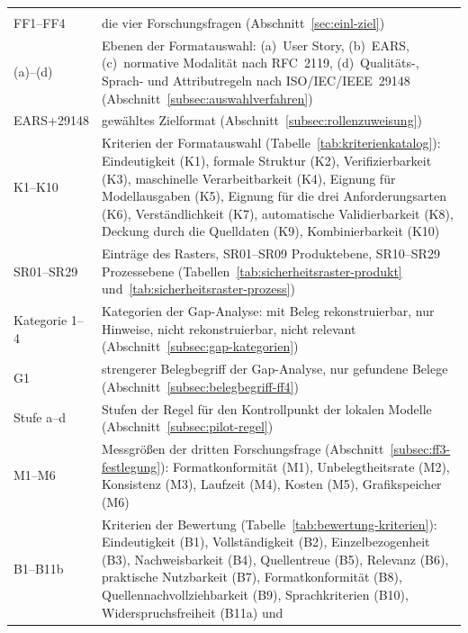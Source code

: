 \documentclass[11pt,a4paper]{report}
\begin{document}
{\begin{longtable}{@{}>{\raggedright\arraybackslash}p{2.9cm}%
                   >{\raggedright\arraybackslash}p{10.6cm}@{}}
  \multicolumn{2}{@{}l}{\textbf{Kennungen dieser Arbeit}} \\
  \midrule
  \endfirsthead
  \multicolumn{2}{@{}l}{\textbf{Kennungen dieser Arbeit} (Fortsetzung)} \\
  \midrule
  \endhead
  FF1--FF4 & die vier Forschungsfragen (Abschnitt~\ref{sec:einl-ziel}) \\
  (a)--(d) & Ebenen der Formatauswahl: (a)~User Story, (b)~EARS,
        (c)~normative Modalität nach RFC~2119, (d)~Qualitäts-, Sprach- und
        Attributregeln nach ISO/IEC/IEEE~29148
        (Abschnitt~\ref{subsec:auswahlverfahren}) \\
  EARS+29148 & gewähltes Zielformat (Abschnitt~\ref{subsec:rollenzuweisung}) \\
  K1--K10 & Kriterien der Formatauswahl (Tabelle~\ref{tab:kriterienkatalog}):
        Eindeutigkeit (K1), formale Struktur (K2), Verifizierbarkeit (K3),
        maschinelle Verarbeitbarkeit (K4), Eignung für Modellausgaben (K5),
        Eignung für die drei Anforderungsarten (K6), Verständlichkeit (K7),
        automatische Validierbarkeit (K8), Deckung durch die Quelldaten
        (K9), Kombinierbarkeit (K10) \\
  SR01--SR29 & Einträge des Rasters, SR01--SR09 Produktebene, SR10--SR29
        Prozessebene (Tabellen~\ref{tab:sicherheitsraster-produkt}
        und~\ref{tab:sicherheitsraster-prozess}) \\
  Kategorie 1--4 & Kategorien der Gap-Analyse: mit Beleg rekonstruierbar,
        nur Hinweise, nicht rekonstruierbar, nicht relevant
        (Abschnitt~\ref{subsec:gap-kategorien}) \\
  G1 & strengerer Belegbegriff der Gap-Analyse, nur gefundene Belege
        (Abschnitt~\ref{subsec:belegbegriff-ff4}) \\
  Stufe a--d & Stufen der Regel für den Kontrollpunkt der lokalen Modelle
        (Abschnitt~\ref{subsec:pilot-regel}) \\
  M1--M6 & Messgrößen der dritten Forschungsfrage
        (Abschnitt~\ref{subsec:ff3-festlegung}): Formatkonformität (M1),
        Unbelegtheitsrate (M2), Konsistenz (M3), Laufzeit (M4), Kosten
        (M5), Grafikspeicher (M6) \\
  B1--B11b & Kriterien der Bewertung (Tabelle~\ref{tab:bewertung-kriterien}):
        Eindeutigkeit (B1), Vollständigkeit (B2), Einzelbezogenheit (B3),
        Nachweisbarkeit (B4), Quellentreue (B5), Relevanz (B6), praktische
        Nutzbarkeit (B7), Formatkonformität (B8), Quellennachvollziehbarkeit
        (B9), Sprachkriterien (B10), Widerspruchsfreiheit (B11a) und

\end{longtable}}
\end{document}
